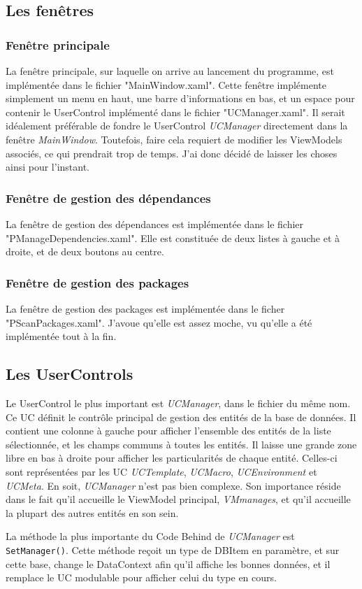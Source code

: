 \documentclass[a4paper, oneside]{article}
\begin{document}
\subsection{Les fenêtres}
\label{sec:org14b8b03}
\subsubsection{Fenêtre principale}
\label{sec:orgd34ba8d}
La fenêtre principale, sur laquelle on arrive au lancement du
programme, est implémentée dans le fichier "MainWindow.xaml". Cette
fenêtre implémente simplement un menu en haut, une barre
d'informations en bas, et un espace pour contenir le UserControl
implémenté dans le fichier "UCManager.xaml". Il serait idéalement
préférable de fondre le UserControl \emph{UCManager} directement dans la
fenêtre \emph{MainWindow}. Toutefois, faire cela requiert de modifier les
ViewModels associés, ce qui prendrait trop de temps. J'ai donc décidé
de laisser les choses ainsi pour l'instant.

\subsubsection{Fenêtre de gestion des dépendances}
\label{sec:orga7af3b4}
La fenêtre de gestion des dépendances est implémentée dans le fichier
"PManageDependencies.xaml". Elle est constituée de deux listes à
gauche et à droite, et de deux boutons au centre.

\subsubsection{Fenêtre de gestion des packages}
\label{sec:orgcfbc3e1}
La fenêtre de gestion des packages est implémentée dans le ficher
"PScanPackages.xaml". J'avoue qu'elle est assez moche, vu qu'elle a
été implémentée tout à la fin.

\subsection{Les UserControls}
\label{sec:org8196fae}
Le UserControl le plus important est \emph{UCManager}, dans le fichier du
même nom. Ce UC définit le contrôle principal de gestion des entités
de la base de données. Il contient une colonne à gauche pour afficher
l'ensemble des entités de la liste sélectionnée, et les champs communs
à toutes les entités. Il laisse une grande zone libre en bas à droite
pour afficher les particularités de chaque entité. Celles-ci sont
représentées par les UC \emph{UCTemplate}, \emph{UCMacro}, \emph{UCEnvironment} et
\emph{UCMeta}. En soit, \emph{UCManager} n'est pas bien complexe. Son importance
réside dans le fait qu'il accueille le ViewModel principal,
\emph{VMmanages}, et qu'il accueille la plupart des autres entités en son
sein.

La méthode la plus importante du Code Behind de \emph{UCManager} est
\texttt{SetManager()}. Cette méthode reçoit un type de DBItem en
paramètre, et sur cette base, change le DataContext afin qu'il affiche
les bonnes données, et il remplace le UC modulable pour afficher celui
du type en cours.
\end{document}
